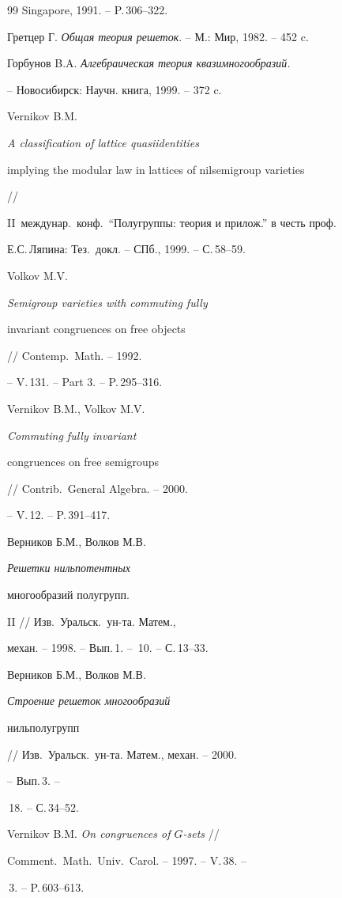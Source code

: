 \begin{thebibliography}{99}
Singapore, 1991. -- P.\,306--322.




Гретцер Г. {\em Общая теория решеток}. -- М.: Мир, 1982. -- 452 c.




Горбунов B.A. {\em Алгебраическая теория квазимногообразий.}


-- Новосибирск: Научн. книга, 1999. -- 372 c.




Vernikov B.M. {\em A classification of lattice quasiidentities


implying the modular law in lattices of nilsemigroup varieties} //


II~междунар.\ конф.\ ``Полугруппы: теория и прилож.'' в честь проф.\


Е.С.\,Ляпина: Тез.\ докл. -- СПб., 1999. -- С.\,58--59.




Volkov M.V. {\em Semigroup varieties with commuting fully


invariant congruences on free objects} // Contemp.\ Math. -- 1992.


-- V.\,131. -- Part 3. -- P.\,295--316.




Vernikov B.M., Volkov M.V. {\em Commuting fully invariant


congruences on free semigroups} // Contrib.\ General Algebra. -- 2000.


-- V.\,12. -- P.\,391--417.




Верников Б.М., Волков М.В. {\em Решетки нильпотентных


многообразий полугрупп.} II // Изв.\ Уральск.\ ун-та. Матем.,


механ. -- 1998. -- Вып.\,1. -- \No\,10. -- С.\,13--33.




Верников Б.М., Волков М.В. {\em Строение решеток многообразий


нильполугрупп} // Изв.\ Уральск.\ ун-та. Матем., механ. -- 2000.


-- Вып.\,3. --


\No\,18. -- С.\,34--52.




Vernikov B.M. {\em On congruences of $G$-sets} //


Comment.\ Math.\ Univ.\ Carol. -- 1997. -- V.\,38. --


\No\,3. -- P.\,603--613.





\end{thebibliography}





\vskip 2cm












\label{end}





